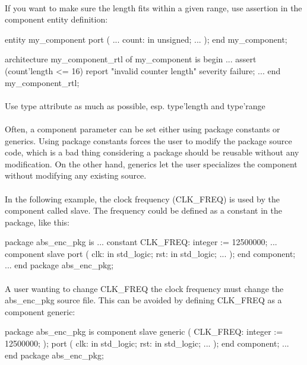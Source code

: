\documentclass[12pt]{article}
\begin{document}
\paragraph{}
If you want to make sure the length fits within a given range,
use assertion in the component entity definition:
\begin{vhdl}
entity my_component
port
(
 ...
 count: in unsigned;
 ...
);
end my_component;

architecture my_component_rtl of my_component is
begin
...
assert (count'length <= 16)
report "invalid counter length"
severity failure;
...
end my_component_rtl;
\end{vhdl}


\paragraph{}
Use type attribute as much as possible, esp. type'length
and type'range


\paragraph{}
Often, a component parameter can be set either using package constants
or generics. Using package constants forces the user to modify the package
source code, which is a bad thing considering a package should be reusable
without any modification. On the other hand, generics let the user specializes
the component without modifying any existing source.

\paragraph{}
In the following example, the clock frequency (CLK\_FREQ) is used by the
component called slave. The frequency could be defined as a constant in the
package, like this:
\begin{vhdl}
package abs_enc_pkg is
...
constant CLK_FREQ: integer := 12500000;
...
component slave
port
(
 clk: in std_logic;
 rst: in std_logic;
 ...
);
end component;
...
end package abs_enc_pkg;
\end{vhdl}

\paragraph{}
A user wanting to change CLK\_FREQ the clock frequency must change the
abs\_enc\_pkg source file. This can be avoided by defining CLK\_FREQ as
a component generic:
\pagebreak
\begin{vhdl}
package abs_enc_pkg is
component slave
generic
(
 CLK_FREQ: integer := 12500000;
);
port
(
 clk: in std_logic;
 rst: in std_logic;
 ...
);
end component;
...
end package abs_enc_pkg;
\end{vhdl}
\end{document}

